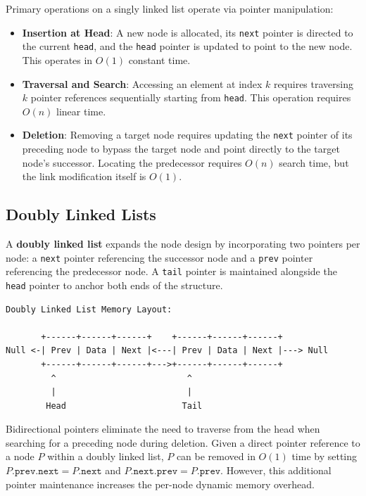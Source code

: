 \documentclass[12pt]{report}
\begin{document}
Primary operations on a singly linked list operate via pointer manipulation:
\begin{itemize}
    \item \textbf{Insertion at Head}: A new node is allocated, its \texttt{next} pointer is directed to the current \texttt{head}, and the \texttt{head} pointer is updated to point to the new node. This operates in $O(1)$ constant time.
    \item \textbf{Traversal and Search}: Accessing an element at index $k$ requires traversing $k$ pointer references sequentially starting from \texttt{head}. This operation requires $O(n)$ linear time.
    \item \textbf{Deletion}: Removing a target node requires updating the \texttt{next} pointer of its preceding node to bypass the target node and point directly to the target node's successor. Locating the predecessor requires $O(n)$ search time, but the link modification itself is $O(1)$.
\end{itemize}

\subsection{Doubly Linked Lists}

A \textbf{doubly linked list} expands the node design by incorporating two pointers per node: a \texttt{next} pointer referencing the successor node and a \texttt{prev} pointer referencing the predecessor node. A \texttt{tail} pointer is maintained alongside the \texttt{head} pointer to anchor both ends of the structure.

\begin{verbatim}
Doubly Linked List Memory Layout:

       +------+------+------+    +------+------+------+
Null <-| Prev | Data | Next |<---| Prev | Data | Next |---> Null
       +------+------+------+--->+------+------+------+
         ^                          ^
         |                          |
        Head                       Tail
\end{verbatim}

Bidirectional pointers eliminate the need to traverse from the head when searching for a preceding node during deletion. Given a direct pointer reference to a node $P$ within a doubly linked list, $P$ can be removed in $O(1)$ time by setting $P.\texttt{prev}.\texttt{next} = P.\texttt{next}$ and $P.\texttt{next}.\texttt{prev} = P.\texttt{prev}$. However, this additional pointer maintenance increases the per-node dynamic memory overhead.
\end{document}

